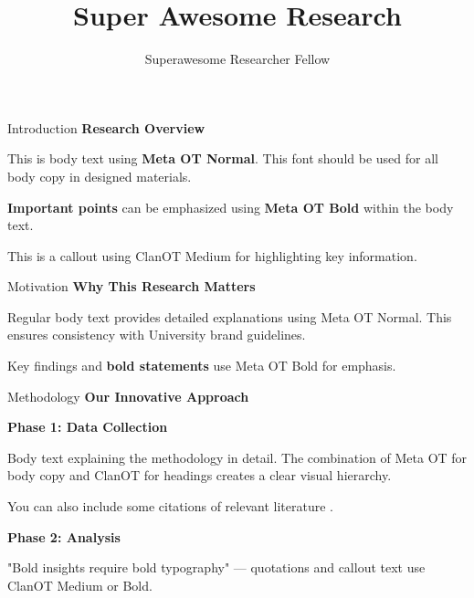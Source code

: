 \documentclass[a0paper
              ,fontscale=0.25
              ,portrait
              ,final]{baposter}
\title{Super Awesome Research}
\author{Superawesome Researcher Fellow}
\institute{Civil and Environmental Engineering, University of Strathclyde}
\newcommand{\headline}[1]{{\clanblack\Large\bfseries #1}}
\newcommand{\subheading}[1]{{\clanbold\large\bfseries #1}}
\newcommand{\callout}[1]{{\clanmedium\large #1}}
\begin{document}
\begin{strathclydeposter}


\begin{posterbox}[name=intro,column=0]{Introduction}
\headline{Research Overview}

This is body text using \textbf{Meta OT Normal}. This font should be used for all body copy in designed materials.

\textbf{Important points} can be emphasized using \textbf{Meta OT Bold} within the body text.

\callout{This is a callout using ClanOT Medium} for highlighting key information.
\end{posterbox}




\begin{posterbox}[name=motiv,below=intro,column=0]{Motivation}
\subheading{Why This Research Matters}

Regular body text provides detailed explanations using Meta OT Normal. This ensures consistency with University brand guidelines.

Key findings and \textbf{bold statements} use Meta OT Bold for emphasis.
\end{posterbox}


\begin{posterbox}[name=method
                ,span=2
                ,column=1]{Methodology}
\headline{Our Innovative Approach}

\subheading{Phase 1: Data Collection}

Body text explaining the methodology in detail. The combination of Meta OT for body copy and ClanOT for headings creates a clear visual hierarchy.

You can also include some citations of relevant literature \cite{smith2022}.

\subheading{Phase 2: Analysis}

\callout{"Bold insights require bold typography"} — quotations and callout text use ClanOT Medium or Bold.


\end{posterbox}
\end{strathclydeposter}
\end{document}
